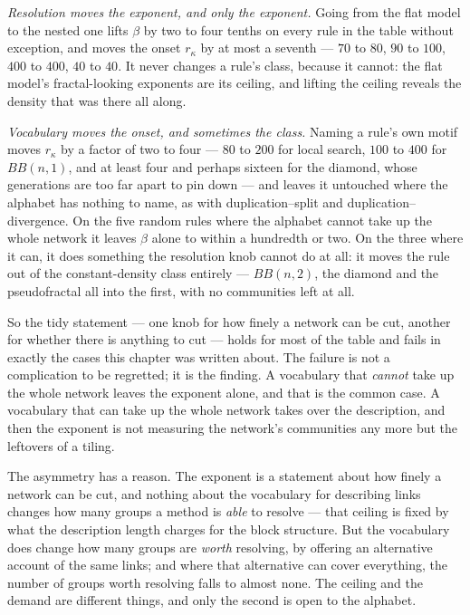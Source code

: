 \emph{Resolution moves the exponent, and only the exponent.} Going from the flat
model to the nested one lifts $\beta$ by two to four tenths on every rule in the
table without exception, and moves the onset $r_\kappa$ by at most a seventh ---
$70$ to $80$, $90$ to $100$, $400$ to $400$, $40$ to $40$. It never changes a
rule's class, because it cannot: the flat model's fractal-looking exponents are
its ceiling, and lifting the ceiling reveals the density that was there all
along.

\emph{Vocabulary moves the onset, and sometimes the class.} Naming a rule's own
motif moves $r_\kappa$ by a factor of two to four --- $80$ to $200$ for local
search, $100$ to $400$ for $BB(n,1)$, and at least four and perhaps sixteen for
the diamond, whose generations are too far apart to pin down --- and leaves it
untouched where the alphabet has nothing to name, as with duplication--split and
duplication--divergence. On the five random rules where the alphabet cannot take
up the whole network it leaves $\beta$ alone to within a hundredth or two. On the
three where it can, it does something the resolution
knob cannot do at all: it moves the rule out of the constant-density class
entirely --- $BB(n,2)$, the diamond and the pseudofractal all into the first,
with no communities left at all.

So the tidy statement --- one knob for how finely a network can be cut, another
for whether there is anything to cut --- holds for most of the table and fails in
exactly the cases this chapter was written about. The failure is not a
complication to be regretted; it is the finding. A vocabulary that
\emph{cannot} take up the whole network leaves the exponent alone, and that is
the common case. A vocabulary that can take up the whole network takes over the
description, and then the exponent is not measuring the network's communities any
more but the leftovers of a tiling.

The asymmetry has a reason. The exponent is a statement about how finely a
network can be cut, and nothing about the vocabulary for describing links changes
how many groups a method is \emph{able} to resolve --- that ceiling is fixed by
what the description length charges for the block structure. But the vocabulary
does change how many groups are \emph{worth} resolving, by offering an
alternative account of the same links; and where that alternative can cover
everything, the number of groups worth resolving falls to almost none. The
ceiling and the demand are different things, and only the second is open to the
alphabet.


